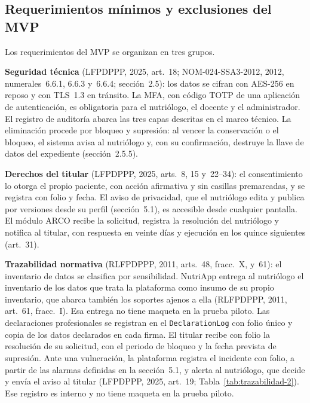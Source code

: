 \documentclass[12pt, a4paper]{article}
\begin{document}
\subsection{Requerimientos mínimos y exclusiones del MVP}
 
Los requerimientos del MVP se organizan en tres grupos.
 
\textbf{Seguridad técnica} (LFPDPPP, 2025, art.~18;
NOM-024-SSA3-2012, 2012, numerales~6.6.1, 6.6.3 y~6.6.4; sección~2.5):
los datos se cifran con AES-256 en reposo
y con TLS~1.3 en tránsito. La MFA,
con código TOTP de una aplicación de autenticación, es
obligatoria para el nutriólogo, el docente y el administrador. El
registro de auditoría abarca las tres capas descritas en el marco
técnico. La eliminación procede por bloqueo y supresión: al vencer la
conservación o el bloqueo, el sistema avisa al nutriólogo y, con su
confirmación, destruye la llave de datos del expediente (sección~2.5.5).
 
\textbf{Derechos del titular} (LFPDPPP, 2025, arts.~8, 15 y~22--34): el
consentimiento lo otorga el propio paciente, con acción afirmativa y
sin casillas premarcadas, y se registra con folio y fecha. El aviso de
privacidad, que el nutriólogo edita y publica por versiones desde su
perfil (sección~5.1), es accesible desde cualquier pantalla. El módulo ARCO
recibe la solicitud, registra la resolución del nutriólogo y notifica
al titular, con respuesta en veinte días y ejecución en los quince
siguientes (art.~31).
 
\textbf{Trazabilidad normativa} (RLFPDPPP, 2011, arts.~48, fracc.~X,
y~61): el inventario de datos se
clasifica por sensibilidad. NutriApp entrega al nutriólogo el inventario
de los datos que trata la plataforma como insumo de su propio
inventario, que abarca también los soportes ajenos a ella (RLFPDPPP,
2011, art.~61, fracc.~I). Esa entrega no tiene maqueta en la prueba
piloto. Las declaraciones profesionales se registran en el
\texttt{DeclarationLog} con folio único y copia de los datos declarados
en cada firma. El titular recibe con folio la resolución de su
solicitud, con el periodo de bloqueo y la fecha prevista de supresión.
Ante una vulneración, la plataforma registra el incidente
con folio, a partir de las alarmas definidas en la sección~5.1, y alerta
al nutriólogo, que decide y envía el aviso al titular (LFPDPPP, 2025,
art.~19; Tabla~\ref{tab:trazabilidad-2}). Ese registro es interno y no
tiene maqueta en la prueba piloto.
 
\end{document}
